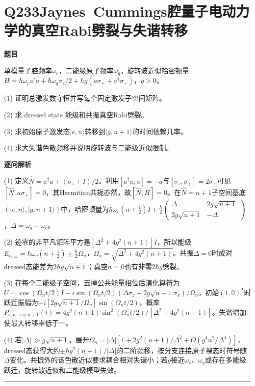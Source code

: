 \documentclass[UTF8,a4paper,11pt,oneside,openany]{ctexbook}
\begin{document}
\section*{Q233\quad Jaynes–Cummings腔量子电动力学的真空Rabi劈裂与失谐转移}
\textbf{题目}\par
单模量子腔频率$\omega_c$，二能级原子频率$\omega_q$，旋转波近似哈密顿量$H=\hbar\omega_ca^\dagger a+\hbar\omega_q\sigma_z/2+\hbar g(a\sigma_++a^\dagger\sigma_-)$，$g>0$。
\par\smallskip\noindent (1) 证明总激发数守恒并写每个固定激发子空间矩阵。
\par\smallskip\noindent (2) 求 dressed state 能级和共振真空Rabi劈裂。
\par\smallskip\noindent (3) 求初始原子激发态$|e,n\rangle$转移到$|g,n+1\rangle$的时间依赖几率。
\par\smallskip\noindent (4) 求大失谐色散频移并说明旋转波与二能级近似限制。
\par\medskip\textbf{逐问解析}\par
\par\smallskip\noindent (1) 定义$\hat N=a^\dagger a+(\sigma_z+I)/2$。利用$[a^\dagger a,a]=-a$与$[\sigma_z,\sigma_+]=2\sigma_+$可见$[\hat N,a\sigma_+]=0$，其Hermitian共轭亦然，故$[\hat N,H]=0$。在$\hat N=n+1$子空间基底$(|e,n\rangle,|g,n+1\rangle)$中，哈密顿量为$\hbar\omega_c(n+\tfrac12)I+\frac\hbar2\begin{pmatrix}\Delta&2g\sqrt{n+1}\\2g\sqrt{n+1}&-\Delta\end{pmatrix}$，$\Delta=\omega_q-\omega_c$。
\par\smallskip\noindent (2) 迹零的非平凡矩阵平方是$[\Delta^2+4g^2(n+1)]I$，所以能级$E_{n,\pm}=\hbar\omega_c(n+\tfrac12)\pm\frac\hbar2\Omega_n$，$\Omega_n=\sqrt{\Delta^2+4g^2(n+1)}$。共振$\Delta=0$时成对dressed态能差为$2\hbar g\sqrt{n+1}$；真空$n=0$也有非零$2\hbar g$劈裂。
\par\smallskip\noindent (3) 在每个二能级子空间，去掉公共能量相位后演化算符为$U=\cos(\Omega_nt/2)I-i\sin(\Omega_nt/2)(\Delta\sigma_z+2g\sqrt{n+1}\sigma_x)/\Omega_n$。初始$(1,0)^T$时跃迁振幅为$-i[2g\sqrt{n+1}/\Omega_n]\sin(\Omega_nt/2)$，概率$P_{e,n\to g,n+1}(t)=4g^2(n+1)\sin^2(\Omega_nt/2)/[\Delta^2+4g^2(n+1)]$。失谐增加使最大转移率低于一。
\par\smallskip\noindent (4) 若$|\Delta|\gg g\sqrt{n+1}$，展开$\Omega_n=|\Delta|[1+2g^2(n+1)/\Delta^2+O(g^4n^2/\Delta^4)]$，dressed态获得大约$\pm\hbar g^2(n+1)/|\Delta|$的二阶频移，按分支连接原子裸态时符号随$\Delta$变化。共振外的该色散近似要求耦合相对失谐小；若$g$接近$\omega_c$、$\omega_q$或存在多能级跃迁，旋转波近似和二能级模型失效。
\par\medskip\hrule\medskip
\end{document}
